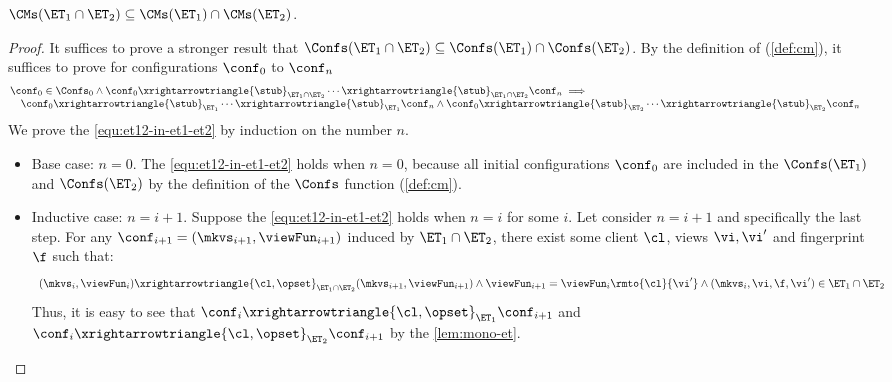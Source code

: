 \begin{lemma}
\label{lem:et12-in-et1-et2}
\( \CMs(\ET_{1} \cap \ET_{2}) \subseteq \CMs(\ET_1) \cap \CMs(\ET_2) \).
\end{lemma}
\begin{proof}
It suffices to prove a stronger result that \( \Confs(\ET_{1} \cap \ET_{2}) \subseteq \Confs(\ET_1) \cap \Confs(\ET_2) \).
By the definition of \Confs (\cref{def:cm}), it suffices to prove for configurations \( \conf_0 \) to \( \conf_n \) 
\begin{equation}
    \label{equ:et12-in-et1-et2}
    \begin{array}{@{}l}
        \conf_0 \in \Confs_0
    \land \conf_0 \xrightarrowtriangle{\stub}_{\ET_1 \cap \ET_2} \cdots \xrightarrowtriangle{\stub}_{\ET_1 \cap \ET_2} \conf_n \implies {} \\
    \quad \conf_0 \xrightarrowtriangle{\stub}_{\ET_{1}} \cdots \xrightarrowtriangle{\stub}_{\ET_{1}} \conf_n \land \conf_0 \xrightarrowtriangle{\stub}_{\ET_{2}} \cdots \xrightarrowtriangle{\stub}_{\ET_{2}} \conf_n 
    \end{array}
\end{equation}
We prove the \cref{equ:et12-in-et1-et2} by induction on the number \( n \).
\begin{itemize}
\item Base case: \(n = 0\). 
The \cref{equ:et12-in-et1-et2} holds when \( n = 0 \), because all initial configurations \( \conf_0 \) are included in the \( \Confs(\ET_1)\) and \( \Confs(\ET_2) \) by the definition of the \( \Confs \) function (\cref{def:cm}).

\item Inductive case: \(n = i+1\). Suppose the \cref{equ:et12-in-et1-et2} holds when \( n = i \) for some \( i \).
Let consider \( n = i + 1 \) and specifically the last step.
For any \( \conf_{i+1} = (\mkvs_{i+1}, \viewFun_{i+1}) \) induced by \( \ET_{1} \cap \ET_2 \), 
there exist some client \( \cl \), views \( \vi, \vi' \) and fingerprint \( \f \) such that:
\[
    \begin{array}{l}
    (\mkvs_i, \viewFun_i) \xrightarrowtriangle{\cl, \opset}_{\ET_{1} \cap \ET_{2}} (\mkvs_{i+1}, \viewFun_{i+1}) 
    \land \viewFun_{i+1} = \viewFun_{i}\rmto{\cl}{\vi'} \land (\mkvs_i, \vi, \f, \vi' ) \in \ET_{1} \cap \ET_{2}
    \end{array}
\]
Thus, it is easy to see that \( \conf_i \xrightarrowtriangle{\cl, \opset}_{\ET_{1}} \conf_{i+1} \) and \( \conf_i \xrightarrowtriangle{\cl, \opset}_{\ET_{2}} \conf_{i+1} \) by the \cref{lem:mono-et}.
\end{itemize}
\end{proof}

